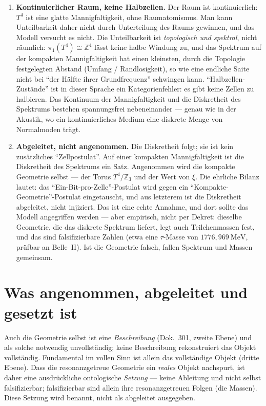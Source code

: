 \begin{enumerate}
\item \textbf{Kontinuierlicher Raum, keine Halbzellen.} Der Raum ist kontinuierlich:
$T^4$ ist eine glatte Mannigfaltigkeit, ohne Raumatomismus. Man kann Unteilbarkeit
daher nicht durch Unterteilung des Raums gewinnen, und das Modell versucht es nicht.
Die Unteilbarkeit ist \emph{topologisch und spektral}, nicht räumlich:
$\pi_1(T^4)\cong\mathbb{Z}^4$ lässt keine halbe Windung zu, und das Spektrum auf der
kompakten Mannigfaltigkeit hat einen kleinsten, durch die Topologie festgelegten
Abstand (Umfang / Randlosigkeit), so wie eine endliche Saite nicht bei \enquote{der
Hälfte ihrer Grundfrequenz} schwingen kann. \enquote{Halbzellen-Zustände} ist in
dieser Sprache ein Kategorienfehler: es gibt keine Zellen zu halbieren. Das Kontinuum
der Mannigfaltigkeit und die Diskretheit des Spektrums bestehen spannungsfrei
nebeneinander --- genau wie in der Akustik, wo ein kontinuierliches Medium eine diskrete
Menge von Normalmoden trägt.

\item \textbf{Abgeleitet, nicht angenommen.} Die Diskretheit folgt; sie ist kein
zusätzliches \enquote{Zellpostulat}. Auf einer kompakten Mannigfaltigkeit ist die
Diskretheit des Spektrums ein Satz. Angenommen wird die kompakte Geometrie selbst ---
der Torus $T^4/\mathbb{Z}_3$ und der Wert von $\xi$. Die ehrliche Bilanz lautet: das
\enquote{Ein-Bit-pro-Zelle}-Postulat wird gegen ein \enquote{Kompakte-Geometrie}-Postulat
eingetauscht, und aus letzterem ist die Diskretheit abgeleitet, nicht injiziert. Das
ist eine echte Annahme, und dort sollte das Modell angegriffen werden --- aber
empirisch, nicht per Dekret: dieselbe Geometrie, die das diskrete Spektrum liefert,
legt auch Teilchenmassen fest, und das sind falsifizierbare Zahlen (etwa eine
$\tau$-Masse von $1776{,}969~\mathrm{MeV}$, prüfbar an Belle~II). Ist die Geometrie
falsch, fallen Spektrum und Massen gemeinsam.
\end{enumerate}

\section{Was angenommen, abgeleitet und gesetzt ist}

Auch die Geometrie selbst ist eine \emph{Beschreibung} (Dok.~301, zweite Ebene) und als
solche notwendig unvollständig; keine Beschreibung rekonstruiert das Objekt vollständig.
Fundamental im vollen Sinn ist allein das vollständige Objekt (dritte Ebene). Dass die
resonanzgetreue Geometrie ein \emph{reales} Objekt nachspurt, ist daher eine
ausdrückliche ontologische \emph{Setzung} --- keine Ableitung und nicht selbst
falsifizierbar; falsifizierbar sind allein ihre resonanzgetreuen Folgen (die Massen).
Diese Setzung wird benannt, nicht als abgeleitet ausgegeben.

